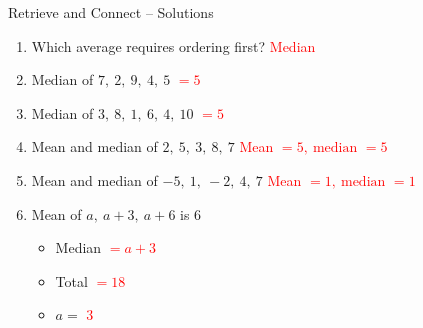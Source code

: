 \documentclass{beamer}
\begin{document}
\begin{frame}{Retrieve and Connect -- Solutions}
\vspace{-0.8em}

\footnotesize
\begin{enumerate}\itemsep2pt
  \item Which average requires ordering first?  
        \textcolor{red}{Median}
  \item Median of $7,\ 2,\ 9,\ 4,\ 5$  
        \textcolor{red}{$=5$}
  \item Median of $3,\ 8,\ 1,\ 6,\ 4,\ 10$  
        \textcolor{red}{$=5$}
  \item Mean and median of $2,\ 5,\ 3,\ 8,\ 7$  
        \textcolor{red}{Mean $=5,\ \text{median }=5$}
  \item Mean and median of $-5,\ 1,\ -2,\ 4,\ 7$  
        \textcolor{red}{Mean $=1,\ \text{median }=1$}
  \item Mean of $a,\ a+3,\ a+6$ is $6$
        \begin{itemize}\footnotesize
          \item Median \textcolor{red}{$=a+3$}
          \item Total \textcolor{red}{$=18$}
          \item $a=$ \textcolor{red}{$3$}
        \end{itemize}
\end{enumerate}
\end{frame}
\end{document}
